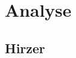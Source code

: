 \section{Analyse} %
\label{sec:analyse}
\begin{comment}
	Detailierte Beschreibung der Algorithmen inkl. O-Notation (Nitty-Gritty Darstellung der Algos)
	1. ARToolKit
	2. ARToolKitPlus
	3. Zissermann/Clarke
	Analyse: Die auswertung nach den Kriterein aus Kap. Vorgehen OHNE WERTUNG! Nur die Daten erheben und auswerten.
\end{comment}

\subsection{Hirzer} %
\label{sub:hirzer}







